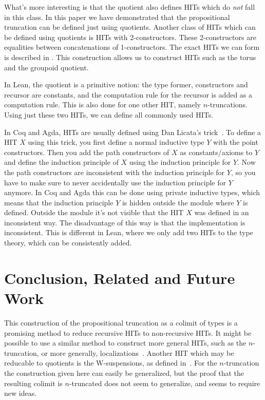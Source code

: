 \documentclass[square]{sigplanconf}
\theoremstyle{definition}
\theoremstyle{remark}
\begin{document}
What's more interesting is that the quotient also defines HITs which do \emph{not} fall in this
class. In this paper we have demonstrated that the propositional truncation can be defined just
using quotients. Another class of HITs which can be defined using quotients is HITs with
2-constructors. These 2-constructors are equalities between concatenations of 1-constructors. The
exact HITs we can form is described in \cite[section HITs]{vanDoorn2015Leanblog}. This construction
allows us to construct HITs such as the torus and the groupoid quotient.

In Lean, the quotient is a primitive notion: the type former, constructors and recursor are
constants, and the computation rule for the recursor is added as a computation rule. This is also
done for one other HIT, namely $n$-truncations. Using just these two HITs, we can define all
commonly used HITs.

In Coq and Agda, HITs are usually defined using Dan Licata's trick~\cite{Licata2011trick}. To define
a HIT $X$ using this trick, you first define a normal inductive type $Y$ with the point
constructors. Then you add the path constructors of $X$ as constants/axioms to $Y$ and define the
induction principle of $X$ using the induction principle for $Y$. Now the path constructors are
inconsistent with the induction principle for $Y$, so you have to make sure to never accidentally
use the induction principle for $Y$ anymore. In Coq and Agda this can be done using private
inductive types, which means that the induction principle $Y$ is hidden outside the module where $Y$
is defined. Outside the module it's not visible that the HIT $X$ was defined in an inconsistent
way. The disadvantage of this way is that the implementation is inconsistent. This is different in
Lean, where we only add two HITs to the type theory, which can be consistently added.

\section{Conclusion, Related and Future Work}\label{s:related}

This construction of the propositional truncation as a colimit of types is a promising method to
reduce recursive HITs to non-recursive HITs. It might be possible to use a similar method to
construct more general HITs, such as the $n$-truncation, or more generally,
localizations~\cite{Shulman2011Localizationblog}. Another HIT which may be reducable to quotients is
the W-suspensions, as defined in~\cite{Sojakova2015HITinitial}. For the $n$-truncation the
construction given here can easily be generalized, but the proof that the resulting colimit is
$n$-truncated does not seem to generalize, and seems to require new ideas.
\end{document}
